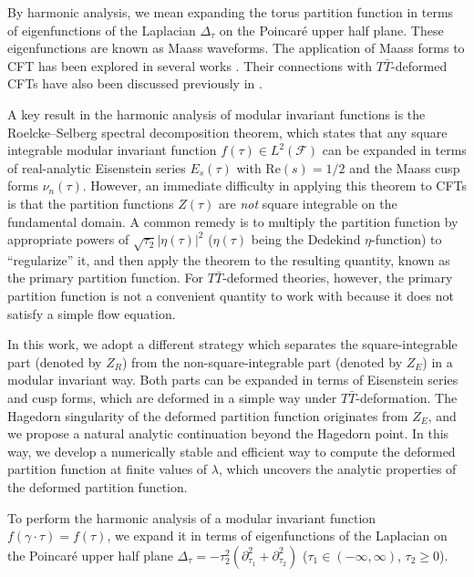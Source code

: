 \documentclass[aps,twocolumn,prl,showpacs,amsmath,amssymb,10pt]{revtex4-2}
\begin{document}
By harmonic analysis, we mean expanding the torus partition function in terms of eigenfunctions of the Laplacian $\Delta_{\tau}$ on the Poincaré upper half plane. These eigenfunctions are known as Maass waveforms. The application of Maass forms to CFT has been explored in several works \cite{Benjamin:2021ygh,Benjamin:2022pnx,DHoker:2022dxx,Haehl:2023tkr,Benjamin:2025kvm,DiUbaldo:2023qli,Boruch:2025ilr,Perlmutter:2025ngj}. Their connections with $T\bar{T}$-deformed CFTs have also been discussed previously in \cite{Benjamin:2023nts,Cardy:2022mhn,Godet:2024ich}.

A key result in the harmonic analysis of modular invariant functions is the Roelcke–Selberg spectral decomposition theorem\cite{rankin1939contributions,selberg1940bemerkungen,zagier1981rankin}, which states that any square integrable modular invariant function $f(\tau)\in L^2(\mathcal{F})$ can be expanded in terms of real-analytic Eisenstein series $E_s(\tau)$ with $\text{Re}(s)=1/2$ and the Maass cusp forms $\nu_n(\tau)$. However, an immediate difficulty in applying this theorem to CFTs is that the partition functions $Z(\tau)$ are \emph{not} square integrable on the fundamental domain. A common remedy is to multiply the partition function by appropriate powers of $\sqrt{\tau_2}|\eta(\tau)|^2$ ($\eta(\tau)$ being the Dedekind $\eta$-function) to ``regularize'' it, and then apply the theorem to the resulting quantity, known as the primary partition function. For $T\bar{T}$-deformed theories, however, the primary partition function is not a convenient quantity to work with because it does not satisfy a simple flow equation.

In this work, we adopt a different strategy which separates the square-integrable part (denoted by $Z_R$) from the non-square-integrable part (denoted by $Z_E$) in a modular invariant way. Both parts can be expanded in terms of Eisenstein series and cusp forms, which are deformed in a simple way under $T\bar{T}$-deformation. The Hagedorn singularity of the deformed partition function originates from $Z_E$, and we propose a natural analytic continuation beyond the Hagedorn point. In this way, we develop a numerically stable and efficient way to compute the deformed partition function at finite values of $\lambda$, which uncovers the analytic properties of the deformed partition function.



\vspace{0.5cm}


  To perform the harmonic analysis of a modular invariant function $f(\gamma\cdot\tau)=f(\tau)$, we expand it in terms of eigenfunctions of the Laplacian on the Poincar\'e upper half plane $\Delta_{\tau}=-\tau_2^2(\partial_{\tau_1}^2+\partial_{\tau_2}^2)$ ($\tau_1\in(-\infty,\infty)$, $\tau_2\ge 0$).
\end{document}
